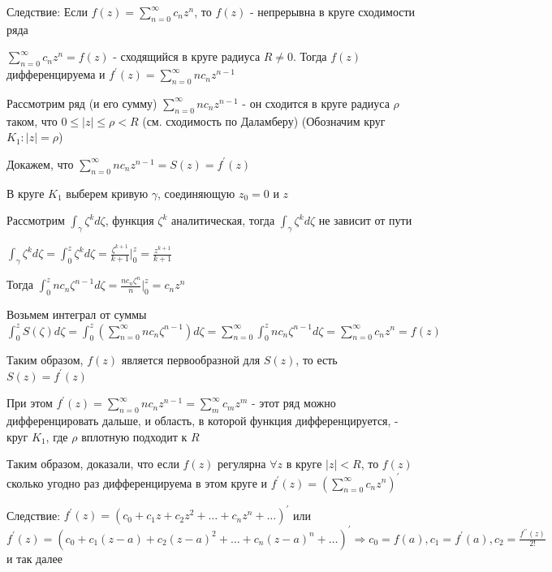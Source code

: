 Следствие: Если $f(z) = \sum_{n = 0}^\infty c_n z^n$, то $f(z)$ - непрерывна в круге сходимости ряда

\begin{MyTheorem}

    $\sum_{n = 0}^\infty c_n z^n = f(z)$ - сходящийся в круге радиуса $R \neq 0$. Тогда $f(z)$ дифференцируема и 
    $f^\prime(z) = \sum_{n = 0}^\infty n c_n z^{n - 1}$
\end{MyTheorem}

\begin{MyProof}
    Рассмотрим ряд (и его сумму) $\sum_{n = 0}^\infty n c_n z^{n - 1}$ - он сходится в круге радиуса $\rho$ таком, что $0 \leq |z| \leq \rho < R$
    (см. сходимость по Даламберу) (Обозначим круг $K_1 : |z| = \rho$)

    Докажем, что $\sum_{n = 0}^\infty n c_n z^{n - 1} = S(z) = f^\prime(z)$

    В круге $K_1$ выберем кривую $\gamma$, соединяющую $z_0 = 0$ и $z$

    Рассмотрим $\int_\gamma \zeta^k d \zeta$, функция $\zeta^k$ аналитическая, тогда $\int_\gamma \zeta^k d\zeta$ не зависит от пути 

    $\int_\gamma \zeta^k d\zeta = \int_0^z \zeta^k d\zeta = \frac{\zeta^{k + 1}}{k + 1} \Big|^z_0 = \frac{z^{k + 1}}{k + 1}$

    Тогда $\int_0^z n c_n \zeta^{n - 1} d\zeta = \frac{n c_n \zeta^n}{n} \Big|_0^z = c_n z^n$

    Возьмем интеграл от суммы $\int_0^z S(\zeta) d\zeta = \int_0^z \left(\sum_{n = 0}^\infty n c_n \zeta^{n - 1}\right) d\zeta = 
    \sum_{n = 0}^\infty \int_0^z n c_n \zeta^{n - 1} d\zeta = \sum_{n = 0}^\infty c_n z^n = f(z)$

    Таким образом, $f(z)$ является первообразной для $S(z)$, то есть $S(z) = f^\prime(z)$

    При этом $f^\prime (z) = \sum_{n = 0}^\infty n c_n z^{n - 1} = \sum_{m}^\infty c_m z^m$ - этот ряд
    можно дифференцировать дальше, и область, в которой функция дифференцируется, - круг $K_1$, где $\rho$ вплотную подходит к $R$

    Таким образом, доказали, что если $f(z)$ регулярна $\forall z$ в круге $|z| < R$, то $f(z)$ сколько угодно раз дифференцируема в этом круге и $f^\prime(z) = \left(\sum_{n = 0}^\infty c_n z^n\right)^\prime$
\end{MyProof}

Следствие: $f^\prime(z) = (c_0 + c_1 z + c_2 z^2 + \dots + c_n z^n + \dots)^\prime$ или 
$f^\prime(z) = (c_0 + c_1 (z - a) + c_2 (z - a)^2 + \dots + c_n (z - a)^n + \dots)^\prime \Longrightarrow c_0 = f(a), c_1 = f^\prime(a), c_2 = \frac{f^{\prime\prime}(z)}{2!}$ и так далее 

